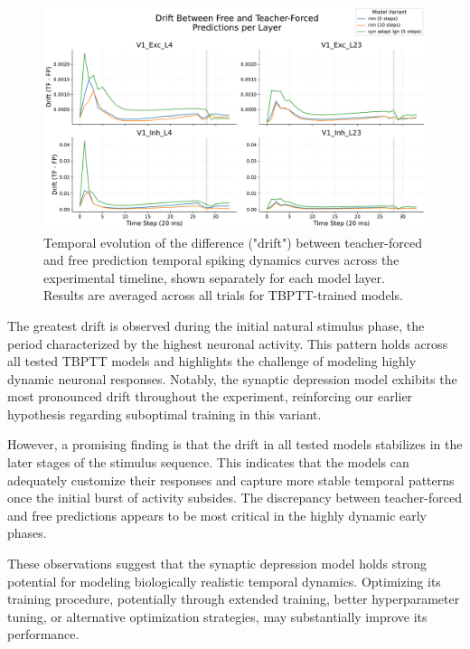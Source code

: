 \begin{figure}
    \centering
    \includegraphics[width=\linewidth]{img/plots/temporal_drift_forced_free.pdf}
    \caption{Temporal evolution of the difference ("drift") between teacher-forced and free prediction temporal spiking dynamics curves across the experimental timeline, shown separately for each model layer. Results are averaged across all trials for TBPTT-trained models.}
    \label{fig:teacher_forced_free_drift}
\end{figure}

The greatest drift is observed during the initial natural stimulus phase, the period characterized by the highest neuronal activity. This pattern holds across all tested TBPTT models and highlights the challenge of modeling highly dynamic neuronal responses. Notably, the synaptic depression model exhibits the most pronounced drift throughout the experiment, reinforcing our earlier hypothesis regarding suboptimal training in this variant.

However, a promising finding is that the drift in all tested models stabilizes in the later stages of the stimulus sequence. This indicates that the models can adequately customize their responses and capture more stable temporal patterns once the initial burst of activity subsides. The discrepancy between teacher-forced and free predictions appears to be most critical in the highly dynamic early phases.

These observations suggest that the synaptic depression model holds strong potential for modeling biologically realistic temporal dynamics. Optimizing its training procedure, potentially through extended training, better hyperparameter tuning, or alternative optimization strategies, may substantially improve its performance.

